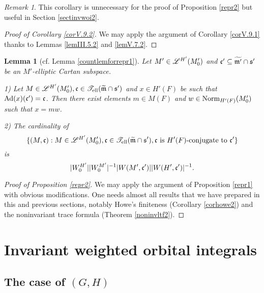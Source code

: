 \documentclass[a4paper]{amsart}
\newcommand{\fm}{{\mathfrak{m}}} \newcommand{\fn}{{\mathfrak{n}}}\newcommand{\fo}{{\mathfrak{o}}} \newcommand{\fp}{{\mathfrak{p}}}
\newcommand{\wt}{\widetilde}                        \newcommand{\wh}{\widehat}                      \newcommand{\wpair}[1]{\left\{{#1}\right\}}
\newtheorem{lem}[thm]{Lemma}
\theoremstyle{definition}
\theoremstyle{remark}
\newtheorem{remark}[thm]{Remark}
\numberwithin{equation}{subsection}
\begin{document}
\begin{remark}
This corollary is unnecessary for the proof of Proposition \ref{repr2} but useful in Section \ref{sectinvwoi2}. 
\end{remark}

\begin{proof}[Proof of Corollary \ref{corV.9.2}]
We may apply the argument of Corollary \ref{corV.9.1} thanks to Lemmas \ref{lemIII.5.2} and \ref{lemV.7.2}. 
\end{proof}

\begin{lem}[cf. Lemma \ref{countlemforrepr1}]\label{countlemforrepr2}
Let $M'\in\mathscr{L}^{H'}(M'_0)$ and $\fc'\subseteq\wt{\fm'}\cap\fs'$ be an $M'$-elliptic Cartan subspace. 

1) Let $M\in\msl^{H'}(M'_0), \fc\in\mst_\el(\wt{\fm}\cap\fs')$ and $x\in H'(F)$ be such that ${\mathrm{Ad}}(x)({\mathfrak{c}}')={\mathfrak{c}} $. Then there exist elements $m\in M(F)$ and $w\in{\mathrm{Norm}}_{H'(F)}(M'_0)$ such that $x=mw$. 

2) The cardinality of
$$ \{(M,\fc): M\in\msl^{H'}(M'_0), \fc\in\mst_\el(\wt{\fm}\cap\fs'), \fc\text{ is }H'(F)\text{-conjugate to }\fc'\} $$
is
$$ |W_0^{H'}||W_0^{M'}|^{-1}|W(M',{\mathfrak{c}}')||W(H',{\mathfrak{c}}')|^{-1}. $$
\end{lem}

\begin{proof}[Proof of Proposition \ref{repr2}]
We may apply the argument of Proposition \ref{repr1} with obvious modifications. One needs almost all results that we have prepared in this and previous sections, notably Howe's finiteness (Corollary \ref{corhowe2}) and the noninvariant trace formula (Theorem \ref{noninvltf2}). 
\end{proof}




\section{\textbf{Invariant weighted orbital integrals}}\label{secinvwoi}

\subsection{The case of $(G,H)$}\label{sectinvwoi1}
\end{document}
